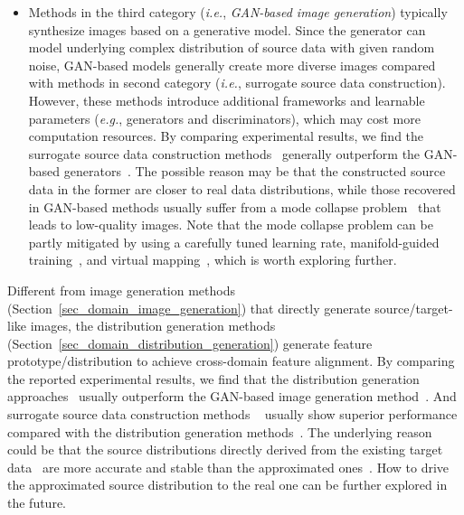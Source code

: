 \documentclass[10pt,journal,compsoc]{IEEEtran}
\def\eg{{\em e.g.}}
\def\ie{{\em i.e.}}
\begin{document}
\begin{itemize}[leftmargin=*]
\item Methods in the third category (\ie, \emph{GAN-based image generation}) typically synthesize images based on a generative model.
Since the generator can model underlying complex distribution of source data with given random noise, GAN-based models generally create more diverse images compared with methods in second category (\ie, surrogate source data construction).
However, these methods introduce additional frameworks and learnable parameters (\eg, generators and discriminators), which may cost more computation resources.
By comparing experimental results, we find the surrogate source data construction methods~\cite{du2021generation, yao2021sourcesurro} generally outperform the GAN-based generators~\cite{kurmi2021domain, li2020model}.
The possible reason may be that the constructed source data in the former are closer to real data distributions, while those recovered in GAN-based methods usually suffer from a mode collapse problem~\cite{ding2022proxymix} that leads to low-quality images. 
Note that the mode collapse problem can be partly mitigated by using a carefully tuned learning rate, manifold-guided training~\cite{bang2021mggan}, and virtual mapping~\cite{abusitta2021virtualgan}, which is worth exploring further. %
\end{itemize}


Different from image generation methods (Section~\ref{sec_domain_image_generation}) that directly generate source/target-like images, the distribution generation methods (Section~\ref{sec_domain_distribution_generation}) generate feature prototype/distribution to achieve cross-domain feature alignment.
By comparing the reported experimental results, we find that the distribution generation approaches~\cite{qiu2021source, tian2021vdm, ding2022source} usually outperform the GAN-based image generation method~\cite{li2020model}.
And surrogate source data construction methods%
~\cite{ding2022proxymix, du2021generation} usually show superior performance compared with the distribution generation methods~\cite{qiu2021source, tian2021vdm}. 
The underlying reason could be that the source distributions directly derived from the existing target data~\cite{ding2022proxymix, du2021generation} are more accurate and stable than the approximated ones~\cite{qiu2021source, tian2021vdm}.
How to drive the approximated source distribution to the real one can be further explored in the future.
\end{document}
